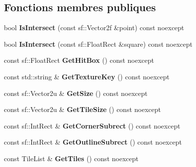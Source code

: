 \subsection*{Fonctions membres publiques}
\begin{DoxyCompactItemize}
\item 
\mbox{\label{classmy_1_1Border_acf58f88a4e6085ddd0f2c63dd5ea0ff5}} 
bool {\bfseries Is\+Intersect} (const sf\+::\+Vector2f \&point) const noexcept
\item 
\mbox{\label{classmy_1_1Border_aa65c4ff4d89fef5edea53a594b32a8cc}} 
bool {\bfseries Is\+Intersect} (const sf\+::\+Float\+Rect \&square) const noexcept
\item 
\mbox{\label{classmy_1_1Border_aab075f5fda8f39ce5cb1fc7fc42cd0b4}} 
const sf\+::\+Float\+Rect {\bfseries Get\+Hit\+Box} () const noexcept
\item 
\mbox{\label{classmy_1_1Border_ab897d683eb3f4e4484f0a23ed419a9e7}} 
const std\+::string \& {\bfseries Get\+Texture\+Key} () const noexcept
\item 
\mbox{\label{classmy_1_1Border_a7235f7cff623e59370b6a044b4cbb060}} 
const sf\+::\+Vector2u \& {\bfseries Get\+Size} () const noexcept
\item 
\mbox{\label{classmy_1_1Border_aaaf6ddc65bc19ffb54f352df35c94090}} 
const sf\+::\+Vector2u \& {\bfseries Get\+Tile\+Size} () const noexcept
\item 
\mbox{\label{classmy_1_1Border_a8da811b24ad62ebb53a9363567f607c7}} 
const sf\+::\+Int\+Rect \& {\bfseries Get\+Corner\+Subrect} () const noexcept
\item 
\mbox{\label{classmy_1_1Border_ad8f5806d2521b3b5c1d7c03bd4b18958}} 
const sf\+::\+Int\+Rect \& {\bfseries Get\+Outline\+Subrect} () const noexcept
\item 
\mbox{\label{classmy_1_1Border_a1d9d83ce552ad3a2fb90cfc496b5e885}} 
const Tile\+List \& {\bfseries Get\+Tiles} () const noexcept
\item 
\mbox{\label{classmy_1_1Border_aa162c706bd04538df15c358618ec56e2}} 

\end{DoxyCompactItemize}
